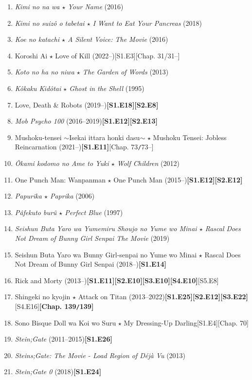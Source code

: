 \documentclass{article}
\numberwithin{equation}{section}
\begin{document}
\begin{enumerate}
    \item \textit{Kimi no na wa $\star$ Your Name} (2016)
    \item \textit{Kimi no suizô o tabetai $\star$ I Want to Eat Your Pancreas} (2018)
    \item \textit{Koe no katachi $\star$ A Silent Voice: The Movie} (2016)
    \item Koroshi Ai $\star$ Love of Kill (2022--)\hfill[S1.E3][Chap. 31/31--]
    \item \textit{Koto no ha no niwa $\star$ The Garden of Words} (2013)
    \item \textit{Kôkaku Kidôtai $\star$ Ghost in the Shell} (1995)
    \item Love, Death \& Robots (2019--)\hfill\textbf{[S1.E18][S2.E8]}
    \item \textit{Mob Psycho 100} (2016--2019)\hfill\textbf{[S1.E12][S2.E13]}
    \item Mushoku-tensei $\sim$Isekai ittara honki dasu$\sim$ $\star$ Mushoku Tensei: Jobless Reincarnation (2021--)\hfill\textbf{[S1.E11]}[Chap. 73\texttt{/}73--]
    \item \textit{Ôkami kodomo no Ame to Yuki $\star$ Wolf Children} (2012)
    \item One Punch Man: Wanpanman $\star$ One Punch Man (2015--)\hfill\textbf{[S1.E12][S2.E12]}
    \item \textit{Papurika $\star$ Paprika} (2006)
    \item \textit{Pâfekuto burû $\star$ Perfect Blue} (1997)
    \item \textit{Seishun Buta Yaro wa Yumemiru Shoujo no Yume wo Minai $\star$ Rascal Does Not Dream of Bunny Girl Senpai The Movie} (2019)
    \item Seishun Buta Yaro wa Bunny Girl-senpai no Yume wo Minai $\star$ Rascal Does Not Dream of Bunny Girl Senpai (2018--)\hfill\textbf{[S1.E14]}
    \item Rick and Morty (2013--)\hfill\textbf{[S1.E11][S2.E10][S3.E10][S4.E10]}[S5.E8]
    \item Shingeki no kyojin $\star$ Attack on Titan (2013--2022)\hfill\textbf{[S1.E25][S2.E12][S3.E22]}[S4.E16]\textbf{[Chap. 139\texttt{/}139]}
    \item Sono Bisque Doll wa Koi wo Suru $\star$ My Dressing-Up Darling\hfill[S1.E4][Chap. 70]
    \item \textit{Stein;Gate} (2011--2015)\hfill\textbf{[S1.E26]}
    \item \textit{Steins;Gate: The Movie - Load Region of Déjà Vu} (2013)
    \item \textit{Stein;Gate 0} (2018)\hfill\textbf{[S1.E24]}

\end{enumerate}
\end{document}
